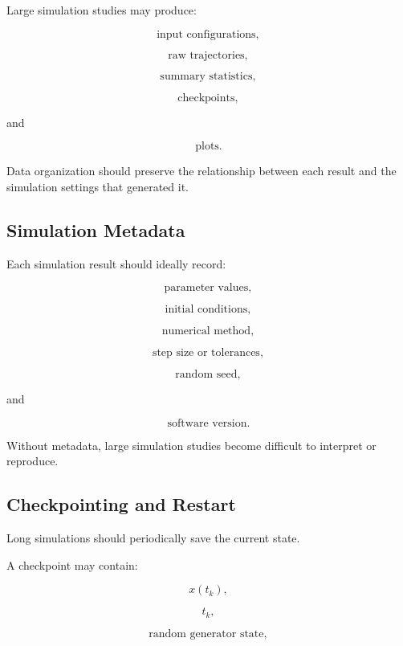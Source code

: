 Large simulation studies may produce:

\[
\boxed{
\text{input configurations},
}
\]

\[
\boxed{
\text{raw trajectories},
}
\]

\[
\boxed{
\text{summary statistics},
}
\]

\[
\boxed{
\text{checkpoints},
}
\]

and

\[
\boxed{
\text{plots}.
}
\]

Data organization should preserve the relationship between each result and
the simulation settings that generated it.

\subsection{Simulation Metadata}
\label{subsec:simulation-metadata}

Each simulation result should ideally record:

\[
\boxed{
\text{parameter values},
}
\]

\[
\boxed{
\text{initial conditions},
}
\]

\[
\boxed{
\text{numerical method},
}
\]

\[
\boxed{
\text{step size or tolerances},
}
\]

\[
\boxed{
\text{random seed},
}
\]

and

\[
\boxed{
\text{software version}.
}
\]

Without metadata, large simulation studies become difficult to interpret
or reproduce.

\subsection{Checkpointing and Restart}
\label{subsec:simulation-checkpointing}

Long simulations should periodically save the current state.

A checkpoint may contain:

\[
\boxed{
x(t_k),
}
\]

\[
\boxed{
t_k,
}
\]

\[
\boxed{
\text{random generator state},
}
\]

